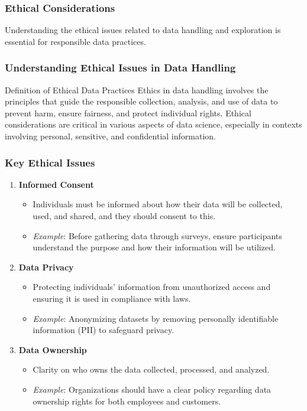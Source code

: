 \documentclass[aspectratio=169]{beamer}
\begin{document}
\begin{frame}
    \frametitle{Ethical Considerations}
    Understanding the ethical issues related to data handling and exploration is essential for responsible data practices.
\end{frame}

\begin{frame}
    \frametitle{Understanding Ethical Issues in Data Handling}
    \begin{block}{Definition of Ethical Data Practices}
        Ethics in data handling involves the principles that guide the responsible collection, analysis, and use of data to prevent harm, ensure fairness, and protect individual rights.
        Ethical considerations are critical in various aspects of data science, especially in contexts involving personal, sensitive, and confidential information.
    \end{block}
\end{frame}

\begin{frame}
    \frametitle{Key Ethical Issues}
    \begin{enumerate}
        \item \textbf{Informed Consent}
            \begin{itemize}
                \item Individuals must be informed about how their data will be collected, used, and shared, and they should consent to this.
                \item \textit{Example}: Before gathering data through surveys, ensure participants understand the purpose and how their information will be utilized.
            \end{itemize}
        \item \textbf{Data Privacy}
            \begin{itemize}
                \item Protecting individuals' information from unauthorized access and ensuring it is used in compliance with laws.
                \item \textit{Example}: Anonymizing datasets by removing personally identifiable information (PII) to safeguard privacy.
            \end{itemize}
        \item \textbf{Data Ownership}
            \begin{itemize}
                \item Clarity on who owns the data collected, processed, and analyzed.
                \item \textit{Example}: Organizations should have a clear policy regarding data ownership rights for both employees and customers.
            \end{itemize}
    \end{enumerate}
\end{frame}
\end{document}
